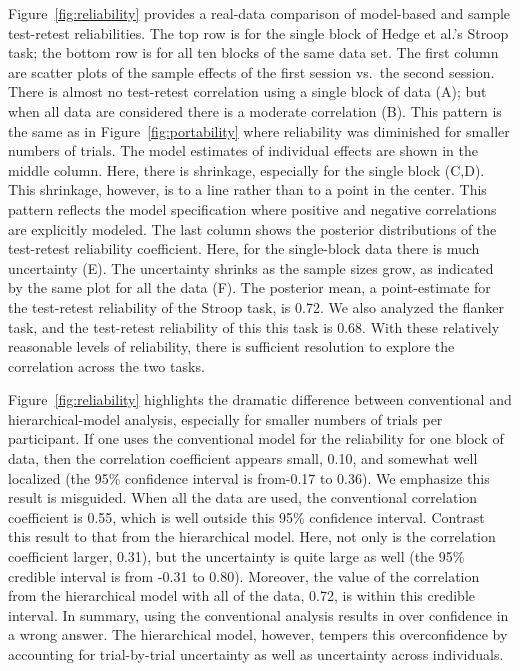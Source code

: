\documentclass[english,man]{apa6}
\theoremstyle{definition}
\theoremstyle{definition}
\theoremstyle{remark}
\begin{document}
Figure~\ref{fig:reliability} provides a real-data comparison of
model-based and sample test-retest reliabilities. The top row is for the
single block of Hedge et al.'s Stroop task; the bottom row is for all
ten blocks of the same data set. The first column are scatter plots of
the sample effects of the first session vs.~the second session. There is
almost no test-retest correlation using a single block of data (A); but
when all data are considered there is a moderate correlation (B). This
pattern is the same as in Figure~\ref{fig:portability} where reliability
was diminished for smaller numbers of trials. The model estimates of
individual effects are shown in the middle column. Here, there is
shrinkage, especially for the single block (C,D). This shrinkage,
however, is to a line rather than to a point in the center. This pattern
reflects the model specification where positive and negative
correlations are explicitly modeled. The last column shows the posterior
distributions of the test-retest reliability coefficient. Here, for the
single-block data there is much uncertainty (E). The uncertainty shrinks
as the sample sizes grow, as indicated by the same plot for all the data
(F). The posterior mean, a point-estimate for the test-retest
reliability of the Stroop task, is 0.72. We also analyzed the flanker
task, and the test-retest reliability of this this task is 0.68. With
these relatively reasonable levels of reliability, there is sufficient
resolution to explore the correlation across the two tasks.

Figure~\ref{fig:reliability} highlights the dramatic difference between
conventional and hierarchical-model analysis, especially for smaller
numbers of trials per participant. If one uses the conventional model
for the reliability for one block of data, then the correlation
coefficient appears small, 0.10, and somewhat well localized (the 95\%
confidence interval is from-0.17 to 0.36). We emphasize this result is
misguided. When all the data are used, the conventional correlation
coefficient is 0.55, which is well outside this 95\% confidence
interval. Contrast this result to that from the hierarchical model.
Here, not only is the correlation coefficient larger, 0.31), but the
uncertainty is quite large as well (the 95\% credible interval is from
-0.31 to 0.80). Moreover, the value of the correlation from the
hierarchical model with all of the data, 0.72, is within this credible
interval. In summary, using the conventional analysis results in over
confidence in a wrong answer. The hierarchical model, however, tempers
this overconfidence by accounting for trial-by-trial uncertainty as well
as uncertainty across individuals.
\end{document}
